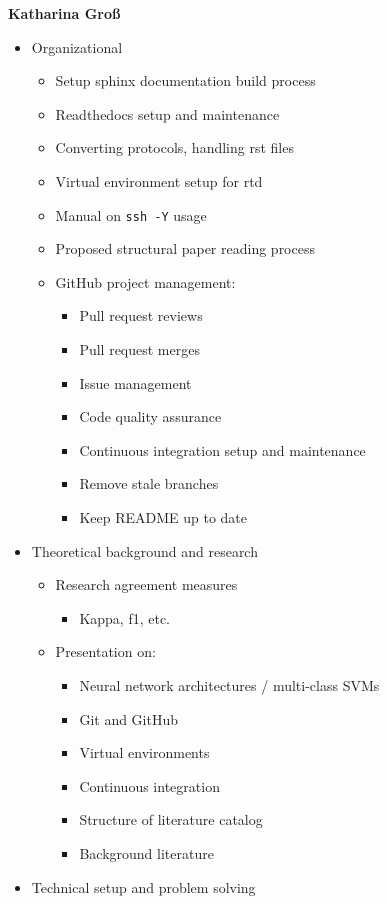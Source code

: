 \bigskip
\textbf{Katharina Groß}
\begin{itemize} 
\item Organizational
\begin{itemize} 
\item Setup sphinx documentation build process
\item Readthedocs setup and maintenance
\item Converting protocols, handling rst files
\item Virtual environment setup for rtd
\item Manual on \texttt{ssh -Y} usage
\item Proposed structural paper reading process
\item GitHub project management:
\begin{itemize} 
\item Pull request reviews
\item Pull request merges
\item Issue management
\item Code quality assurance
\item Continuous integration setup and maintenance
\item Remove stale branches
\item Keep README up to date
\end{itemize}
\end{itemize}
\item Theoretical background and research
\begin{itemize}
\item Research agreement measures
\begin{itemize}
\item Kappa, f1, etc.
\end{itemize}
\item Presentation on:
\begin{itemize}
\item Neural network architectures / multi-class SVMs
\item Git and GitHub
\item Virtual environments
\item Continuous integration
\item Structure of literature catalog
\item Background literature
\end{itemize}
\end{itemize}
\item Technical setup and problem solving
\begin{itemize}

\end{itemize}
\end{itemize}
